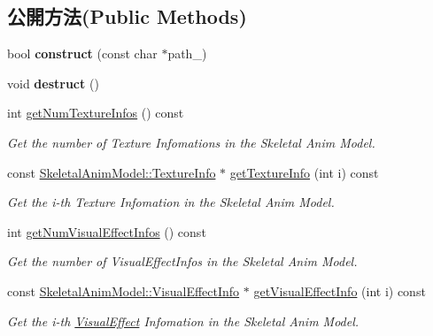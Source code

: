 \subsection*{公開方法(Public Methods)}
\begin{DoxyCompactItemize}
\item 
bool {\bfseries construct} (const char $\ast$path\+\_\+)\hypertarget{class_magnum_1_1_skeletal_anim_model_aa39b6a86f5a349a45a73efdc533df4ec}{}\label{class_magnum_1_1_skeletal_anim_model_aa39b6a86f5a349a45a73efdc533df4ec}

\item 
void {\bfseries destruct} ()\hypertarget{class_magnum_1_1_skeletal_anim_model_aad34e28ad03cc15d6d7aa3469a785169}{}\label{class_magnum_1_1_skeletal_anim_model_aad34e28ad03cc15d6d7aa3469a785169}

\item 
int \hyperlink{class_magnum_1_1_skeletal_anim_model_a4627fe01045a07025d89ed1f063b5ce4}{get\+Num\+Texture\+Infos} () const 
\begin{DoxyCompactList}\small\item\em Get the number of Texture Infomations in the Skeletal Anim Model. \end{DoxyCompactList}\item 
const \hyperlink{class_magnum_1_1_skeletal_anim_model_1_1_texture_info}{Skeletal\+Anim\+Model\+::\+Texture\+Info} $\ast$ \hyperlink{class_magnum_1_1_skeletal_anim_model_a58eb7b1c0989d7a85c8615c29207cf35}{get\+Texture\+Info} (int i) const 
\begin{DoxyCompactList}\small\item\em Get the i-\/th Texture Infomation in the Skeletal Anim Model. \end{DoxyCompactList}\item 
int \hyperlink{class_magnum_1_1_skeletal_anim_model_ae04c287408e52c5ce8636ab032c1de58}{get\+Num\+Visual\+Effect\+Infos} () const 
\begin{DoxyCompactList}\small\item\em Get the number of Visual\+Effect\+Infos in the Skeletal Anim Model. \end{DoxyCompactList}\item 
const \hyperlink{class_magnum_1_1_skeletal_anim_model_1_1_visual_effect_info}{Skeletal\+Anim\+Model\+::\+Visual\+Effect\+Info} $\ast$ \hyperlink{class_magnum_1_1_skeletal_anim_model_a347a76d9c59646ea702ecac3e1914deb}{get\+Visual\+Effect\+Info} (int i) const 
\begin{DoxyCompactList}\small\item\em Get the i-\/th \hyperlink{class_magnum_1_1_visual_effect}{Visual\+Effect} Infomation in the Skeletal Anim Model. \end{DoxyCompactList}\item 

\end{DoxyCompactItemize}
